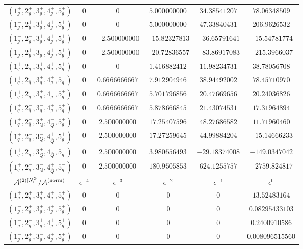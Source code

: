 \begin{table}[!htbp]
\begin{adjustbox}{width=1\textwidth}
\begin{tabular}{cccccc}
      \midrule
      $( 1_g^+, 2_g^+, 3_g^+, 4_g^+, 5_g^+ )$ & 0 & 0 & $5.000000000$ & $34.38541207$ & $78.06348509$ \\
      $( 1_g^-, 2_g^+, 3_g^+, 4_g^+, 5_g^+ )$ & 0 & 0 & $5.000000000$ & $47.33840431$ & $206.9626532$ \\
      $( 1_g^-, 2_g^-, 3_g^+, 4_g^+, 5_g^+ )$ & 0 & $-2.500000000$ & $-15.82327813$ & $-36.65791641$ & $-15.54781774$ \\
      $( 1_g^-, 2_g^+, 3_g^-, 4_g^+, 5_g^+ )$ & 0 & $-2.500000000$ & $-20.72836557$ & $-83.86917083$ & $-215.3966037$ \\
      \midrule
      $( 1_q^+, 2_{\bar q}^-, 3_g^+, 4_g^+, 5_g^+ )$ & 0 & 0 & $1.416882412$ & $11.98234731$ & $38.78056708$ \\
      $( 1_q^+, 2_{\bar q}^-, 3_g^+, 4_g^+, 5_g^- )$ & 0 & $0.6666666667$ & $7.912904946$ & $38.94492002$ & $78.45710970$ \\
      $( 1_q^+, 2_{\bar q}^-, 3_g^+, 4_g^-, 5_g^+ )$ & 0 & $0.6666666667$ & $5.701796856$ & $20.47669656$ & $20.24036826$ \\
      $( 1_q^+, 2_{\bar q}^-, 3_g^-, 4_g^+, 5_g^+ )$ & 0 & $0.6666666667$ & $5.878666845$ & $21.43074531$ & $17.31964894$ \\
      \midrule
      $( 1_q^+, 2_{\bar q}^-, 3_Q^+, 4_{\bar Q}^-, 5_g^+ )$ & 0 & $2.500000000$ & $17.25407596$ & $48.27686582$ & $11.71960460$ \\
      $( 1_q^+, 2_{\bar q}^-, 3_Q^-, 4_{\bar Q}^+, 5_g^+ )$ & 0 & $2.500000000$ & $17.27259645$ & $44.99884204$ & $-15.14666233$ \\
      $( 1_q^+, 2_{\bar q}^-, 3_Q^+, 4_{\bar Q}^-, 5_g^- )$ & 0 & $2.500000000$ & $3.980556493$ & $-29.18374008$ & $-149.0347042$ \\
      $( 1_q^+, 2_{\bar q}^-, 3_Q^-, 4_{\bar Q}^+, 5_g^- )$ & 0 & $2.500000000$ & $180.9505853$ & $624.1255757$ & $-2759.824817$ \\
      \midrule
      $\mathcal{A}^{(2)[N_\mathrm{f}^2]}/\mathcal{A}^\mathrm{(norm)}$	  &   $\epsilon^{-4}$   &   $\epsilon^{-3}$   &   $\epsilon^{-2}$   &   $\epsilon^{-1}$   &   $\epsilon^{0}$   \\
      \midrule
      $( 1_g^+, 2_g^+, 3_g^+, 4_g^+, 5_g^+ )$ & 0 & 0 & 0 & 0 & $13.52483164$ \\
      $( 1_g^-, 2_g^+, 3_g^+, 4_g^+, 5_g^+ )$ & 0 & 0 & 0 & 0 & $0.08295433103$ \\
      $( 1_g^-, 2_g^-, 3_g^+, 4_g^+, 5_g^+ )$ & 0 & 0 & 0 & 0 & $0.2400910586$ \\
      $( 1_g^-, 2_g^+, 3_g^-, 4_g^+, 5_g^+ )$ & 0 & 0 & 0 & 0 & $0.008096515560$ \\

\end{tabular}
\end{adjustbox}
\end{table}
